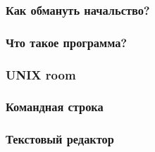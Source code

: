 \documentclass[t,aspectratio=169]{beamer}
\begin{document}
\begin{frame}
    \frametitle{Как обмануть начальство?}
\end{frame}

\begin{frame}
    \frametitle{Что такое программа?}
\end{frame}

\begin{frame}
    \frametitle{UNIX room}
\end{frame}

\begin{frame}
    \frametitle{Командная строка}
\end{frame}

\begin{frame}
    \frametitle{Текстовый редактор}
\end{frame}
\end{document}
